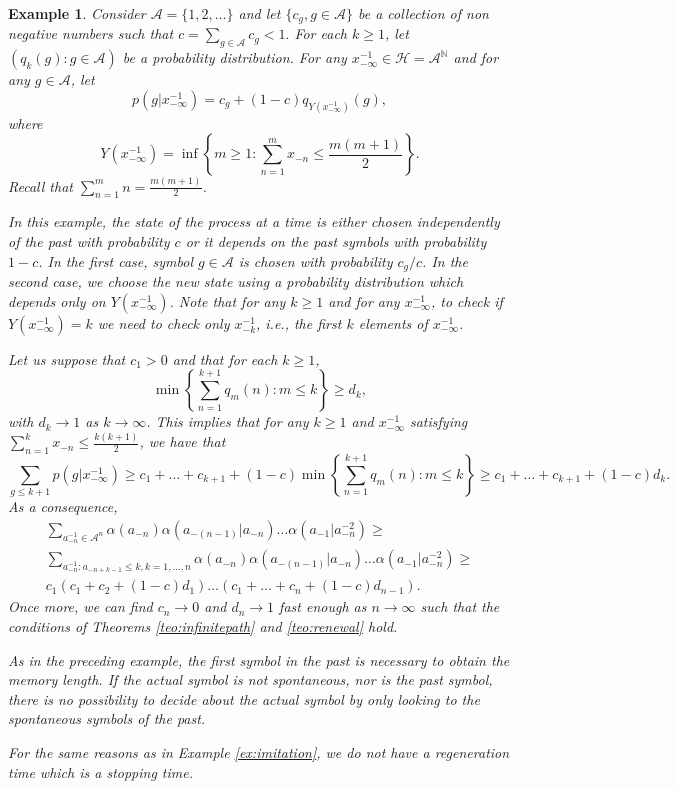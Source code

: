 \documentclass[a4paper]{article}
\newtheorem{example}[theorem]{Example}
\newcommand{\N}{\mathbb{N}}
\renewcommand{\H}{\mathcal{H}}
\newcommand{\A}{\mathcal{A}}
\begin{document}
\begin{example} \label{ex:other}
Consider $\A=\{1,2,\ldots\}$ and let $ \{c_g, g \in \A \}$  be a collection of non negative numbers such that $c=\sum_{g\in \A}c_g <1.$ For each $k\geq 1$, let $(q_k(g):g\in \A)$ be a probability distribution. For any $x_{-\infty}^{-1}\in \H=\A^{\N}$ and for any $g\in \A$, let
\begin{equation}\label{eq:sec_example}
p(g|x_{-\infty}^{-1})=c_g+(1-c)q_{Y(x_{-\infty}^{-1})}(g),
\end{equation}
where 
$$
Y(x_{-\infty}^{-1})=\inf\left\{m\geq 1: \sum_{n=1}^mx_{-n} \leq \frac{m(m+1)}{2}\right\}.
$$
Recall that $\sum_{n=1}^mn=\frac{m(m+1)}{2}$.

In this example, the state of the process at a time is either chosen independently of the past with probability $c$ or it depends on the past symbols with probability $1-c$. In the first case, symbol $g\in \A$ is chosen with probability $c_g/c$. In the second case, we choose the new state using a probability distribution which depends only on $Y(x_{-\infty}^{-1})$. Note that for any $k\geq 1$ and for any $x_{-\infty}^{-1}$, to check if $Y(x_{-\infty}^{-1})=k$ we need to check only $x_{-k}^{-1}$, i.e., the first $k$ elements of $x_{-\infty}^{-1}$.



Let us suppose that $c_1>0$ and that for each $k\geq 1$, 
$$
\min\left\{\sum_{n=1}^{k+1}q_m(n):m\leq k\right\}\geq d_k,
$$
with $d_k \to 1$ as $k\to \infty$. This implies that for any $k\geq 1$ and $x_{-\infty}^{-1}$ satisfying $\sum_{n=1}^kx_{-n} \leq \frac{k(k+1)}{2}$, we have that
$$
\sum_{g\leq k+1}p(g|x_{-\infty}^{-1}) \geq c_1+\ldots +c_{k+1}+(1-c)\min\left\{\sum_{n=1}^{k+1}q_m(n):m\leq k\right\} \geq c_1+\ldots + c_{k+1}+(1-c)d_k.
$$
As a consequence, 
\begin{multline*}
\sum_{a_{-n}^{-1}\in \A^n}\alpha(a_{-n})\alpha(a_{-(n-1)}|a_{-n})\ldots \alpha(a_{-1}|a_{-n}^{-2})\geq \\ 
\sum_{a_{-n}^{-1}:a_{-n+k-1}\leq k, k=1,\ldots, n }\alpha(a_{-n})\alpha(a_{-(n-1)}|a_{-n})\ldots \alpha(a_{-1}|a_{-n}^{-2})\geq \\ 
 c_1(c_1+c_2+(1-c)d_1)\ldots (c_1+\ldots + c_n+(1-c)d_{n-1}).
\end{multline*}
Once more, we can find $c_n \to 0$ and $d_n\to 1$ fast enough as $n\to \infty$ such that the conditions of Theorems \ref{teo:infinitepath} and \ref{teo:renewal}  hold.

As in the preceding example, the first symbol in the past is necessary to obtain the memory length. If the actual symbol is not spontaneous, nor is the past symbol, there is no possibility to decide about the actual symbol by only looking to the spontaneous symbols of the past. %

For the same reasons as in Example \ref{ex:imitation}, we do not have a regeneration time which is a stopping time. %
    
\end{example}
\end{document}
